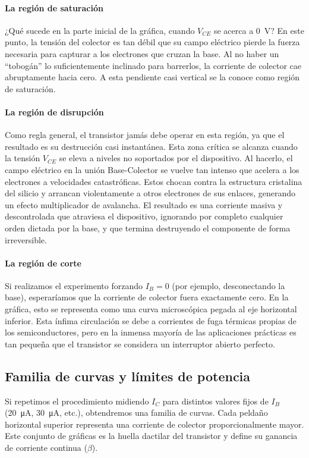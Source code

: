 \paragraph{La región de saturación}
¿Qué sucede en la parte inicial de la gráfica, cuando \(V_{CE}\) se acerca a \qty{0}{\volt}? En este punto, la tensión del colector es tan débil que su campo eléctrico pierde la fuerza necesaria para capturar a los electrones que cruzan la base. Al no haber un ``tobogán'' lo suficientemente inclinado para barrerlos, la corriente de colector cae abruptamente hacia cero. A esta pendiente casi vertical se la conoce como región de saturación.

\paragraph{La región de disrupción}
Como regla general, el transistor jamás debe operar en esta región, ya que el resultado es su destrucción casi instantánea. Esta zona crítica se alcanza cuando la tensión $V_{CE}$ se eleva a niveles no soportados por el dispositivo. Al hacerlo, el campo eléctrico en la unión Base-Colector se vuelve tan intenso que acelera a los electrones a velocidades catastróficas. Estos chocan contra la estructura cristalina del silicio y arrancan violentamente a otros electrones de sus enlaces, generando un efecto multiplicador de avalancha. El resultado es una corriente masiva y descontrolada que atraviesa el dispositivo, ignorando por completo cualquier orden dictada por la base, y que termina destruyendo el componente de forma irreversible.

\paragraph{La región de corte}
Si realizamos el experimento forzando \(I_B = 0\) (por ejemplo, desconectando la base), esperaríamos que la corriente de colector fuera exactamente cero. En la gráfica, esto se representa como una curva microscópica pegada al eje horizontal inferior. Esta ínfima circulación se debe a corrientes de fuga térmicas propias de los semiconductores, pero en la inmensa mayoría de las aplicaciones prácticas es tan pequeña que el transistor se considera un interruptor abierto perfecto.

\subsection{Familia de curvas y límites de potencia}
Si repetimos el procedimiento midiendo \(I_C\) para distintos valores fijos de \(I_B\) (\qty{20}{\micro\ampere}, \qty{30}{\micro\ampere}, etc.), obtendremos una familia de curvas. Cada peldaño horizontal superior representa una corriente de colector proporcionalmente mayor. Este conjunto de gráficas es la huella dactilar del transistor y define su ganancia de corriente continua (\(\beta\)).

